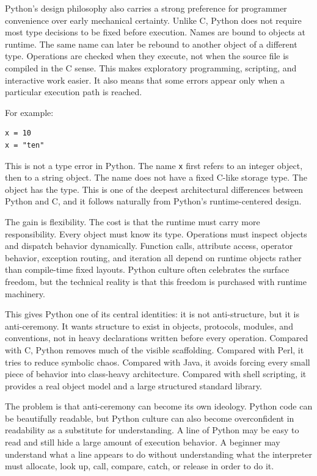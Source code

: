 Python’s design philosophy also carries a strong preference for programmer convenience over early mechanical certainty. Unlike C, Python does not require most type decisions to be fixed before execution. Names are bound to objects at runtime. The same name can later be rebound to another object of a different type. Operations are checked when they execute, not when the source file is compiled in the C sense. This makes exploratory programming, scripting, and interactive work easier. It also means that some errors appear only when a particular execution path is reached.

For example:

\begin{verbatim}
x = 10
x = "ten"
\end{verbatim}

This is not a type error in Python. The name \texttt{x} first refers to an integer object, then to a string object. The name does not have a fixed C-like storage type. The object has the type. This is one of the deepest architectural differences between Python and C, and it follows naturally from Python's runtime-centered design.

The gain is flexibility. The cost is that the runtime must carry more responsibility. Every object must know its type. Operations must inspect objects and dispatch behavior dynamically. Function calls, attribute access, operator behavior, exception routing, and iteration all depend on runtime objects rather than compile-time fixed layouts. Python culture often celebrates the surface freedom, but the technical reality is that this freedom is purchased with runtime machinery.

This gives Python one of its central identities: it is not anti-structure, but it is anti-ceremony. It wants structure to exist in objects, protocols, modules, and conventions, not in heavy declarations written before every operation. Compared with C, Python removes much of the visible scaffolding. Compared with Perl, it tries to reduce symbolic chaos. Compared with Java, it avoids forcing every small piece of behavior into class-heavy architecture. Compared with shell scripting, it provides a real object model and a large structured standard library.

The problem is that anti-ceremony can become its own ideology. Python code can be beautifully readable, but Python culture can also become overconfident in readability as a substitute for understanding. A line of Python may be easy to read and still hide a large amount of execution behavior. A beginner may understand what a line appears to do without understanding what the interpreter must allocate, look up, call, compare, catch, or release in order to do it.

